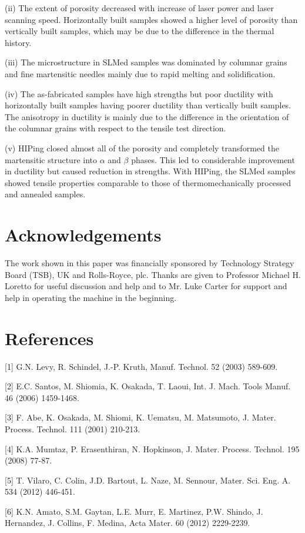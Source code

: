 \documentclass[10pt]{article}
\begin{document}
(ii) The extent of porosity decreased with increase of laser power and laser scanning speed. Horizontally built samples showed a higher level of porosity than vertically built samples, which may be due to the difference in the thermal history.

(iii) The microstructure in SLMed samples was dominated by columnar grains and fine martensitic needles mainly due to rapid melting and solidification.

(iv) The as-fabricated samples have high strengths but poor ductility with horizontally built samples having poorer ductility than vertically built samples. The anisotropy in ductility is mainly due to the difference in the orientation of the columnar grains with respect to the tensile test direction.

(v) HIPing closed almost all of the porosity and completely transformed the martensitic structure into $\alpha$ and $\beta$ phases. This led to considerable improvement in ductility but caused reduction in strengths. With HIPing, the SLMed samples showed tensile properties comparable to those of thermomechanically processed and annealed samples.

\section*{Acknowledgements}
The work shown in this paper was financially sponsored by Technology Strategy Board (TSB), UK and Rolls-Royce, plc. Thanks are given to Professor Michael H. Loretto for useful discussion and help and to Mr. Luke Carter for support and help in operating the machine in the beginning.

\section*{References}
[1] G.N. Levy, R. Schindel, J.-P. Kruth, Manuf. Technol. 52 (2003) 589-609.

[2] E.C. Santos, M. Shiomia, K. Osakada, T. Laoui, Int. J. Mach. Tools Manuf. 46 (2006) 1459-1468.

[3] F. Abe, K. Osakada, M. Shiomi, K. Uematsu, M. Matsumoto, J. Mater. Process. Technol. 111 (2001) 210-213.

[4] K.A. Mumtaz, P. Erasenthiran, N. Hopkinson, J. Mater. Process. Technol. 195 (2008) 77-87.

[5] T. Vilaro, C. Colin, J.D. Bartout, L. Naze, M. Sennour, Mater. Sci. Eng. A. 534 (2012) 446-451.

[6] K.N. Amato, S.M. Gaytan, L.E. Murr, E. Martinez, P.W. Shindo, J. Hernandez, J. Collins, F. Medina, Acta Mater. 60 (2012) 2229-2239.
\end{document}
